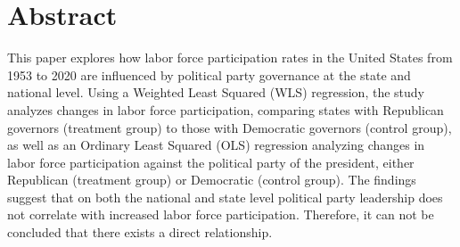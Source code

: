\chapter{Abstract}

This paper explores how labor force participation rates in the United States from 1953 to 2020 are influenced by political party governance at the state and national level. Using a Weighted Least Squared (WLS) regression, the study analyzes changes in labor force participation, comparing states with Republican governors (treatment group) to those with Democratic governors (control group), as well as an Ordinary Least Squared (OLS) regression analyzing changes in labor force participation against the political party of the president, either Republican (treatment group) or Democratic (control group). The findings suggest that on both the national and state level political party leadership does not correlate with increased labor force participation. Therefore, it can not be concluded that there exists a direct relationship.